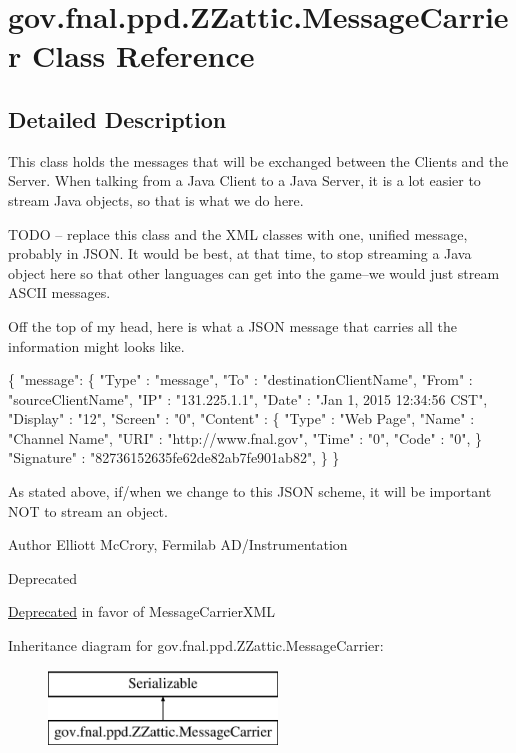 \hypertarget{classgov_1_1fnal_1_1ppd_1_1ZZattic_1_1MessageCarrier}{\section{gov.\-fnal.\-ppd.\-Z\-Zattic.\-Message\-Carrier Class Reference}
\label{classgov_1_1fnal_1_1ppd_1_1ZZattic_1_1MessageCarrier}
}


\subsection{Detailed Description}
This class holds the messages that will be exchanged between the Clients and the Server. When talking from a Java Client to a Java Server, it is a lot easier to stream Java objects, so that is what we do here.

T\-O\-D\-O -- replace this class and the X\-M\-L classes with one, unified message, probably in J\-S\-O\-N. It would be best, at that time, to stop streaming a Java object here so that other languages can get into the game--we would just stream A\-S\-C\-I\-I messages.

Off the top of my head, here is what a J\-S\-O\-N message that carries all the information might looks like.


\begin{DoxyPre}
\{ "message": \{
    "Type"    : "message",
    "To"      : "destinationClientName",
    "From"    : "sourceClientName",
    "IP"      : "131.225.1.1",
    "Date"    : "Jan 1, 2015 12:34:56 CST",
    "Display" : "12",
    "Screen"  : "0",
    "Content" : \{
            "Type" : "Web Page",
         "Name" : "Channel Name",
         "URI"  : "http://www.fnal.gov",
         "Time" : "0",
         "Code" : "0",         
    \}
    "Signature" : "82736152635fe62de82ab7fe901ab82",
  \}
\}
\end{DoxyPre}


As stated above, if/when we change to this J\-S\-O\-N scheme, it will be important N\-O\-T to stream an object.

\begin{DoxyAuthor}{Author}
Elliott Mc\-Crory, Fermilab A\-D/\-Instrumentation
\end{DoxyAuthor}
\begin{DoxyRefDesc}{Deprecated}
\item[\hyperlink{deprecated__deprecated000017}{Deprecated}]in favor of Message\-Carrier\-X\-M\-L \end{DoxyRefDesc}
Inheritance diagram for gov.\-fnal.\-ppd.\-Z\-Zattic.\-Message\-Carrier\-:\begin{figure}[H]
\begin{center}
\leavevmode
\includegraphics[height=2.000000cm]{classgov_1_1fnal_1_1ppd_1_1ZZattic_1_1MessageCarrier}
\end{center}
\end{figure}
